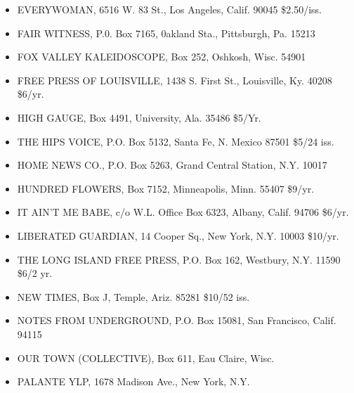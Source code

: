 \documentclass[11pt,twoside,a4paper]{book}
\begin{document}
\begin{minipage}[t]{0.20\textwidth}
\begin{scriptsize}
\begin{itemize}
	\item[] EVERYWOMAN, 6516 W. 83 St., Los Angeles, Calif. 90045 \$2.50/iss. 
	\item[] FAIR WITNESS, P.0. Box 7165, 0akland Sta., Pittsburgh, Pa. 15213 
	\item[] FOX VALLEY KALEIDOSCOPE, Box 252, Oshkosh, Wisc. 54901 
	\item[] FREE PRESS OF LOUISVILLE, 1438 S. First St., Louisville, Ky. 40208 \$6/yr. 
	\item[] HIGH GAUGE, Box 4491, University, Ala. 35486 \$5/Yr. 
	\item[] THE HIPS VOICE, P.O. Box 5132, Santa Fe, N. Mexico 87501 \$5/24 iss. 
	\item[] HOME NEWS CO., P.O. Box 5263, Grand Central Station, N.Y. 10017 
	\item[] HUNDRED FLOWERS, Box 7152, Minneapolis, Minn. 55407 \$9/yr. 
	\item[] IT AIN'T ME BABE, c/o W.L. Office Box 6323, Albany, Calif. 94706	\$6/yr. 
	\item[] LIBERATED GUARDIAN, 14 Cooper Sq., New York, N.Y. 10003  \$10/yr. 
	\item[] THE LONG ISLAND FREE PRESS, P.O. Box 162, Westbury, N.Y. 11590	\$6/2 yr. 
	\item[] NEW TIMES, Box J, Temple, Ariz. 85281 \$10/52 iss. 
	\item[] NOTES FROM UNDERGROUND, P.O. Box 15081, San Francisco, Calif. 94115 
	\item[] OUR TOWN (COLLECTIVE), Box 611, Eau Claire, Wisc. 
	\item[] PALANTE YLP, 1678 Madison Ave., New York, N.Y. 
\end{itemize}
\end{scriptsize}
\end{minipage}\hfill
\end{document}
